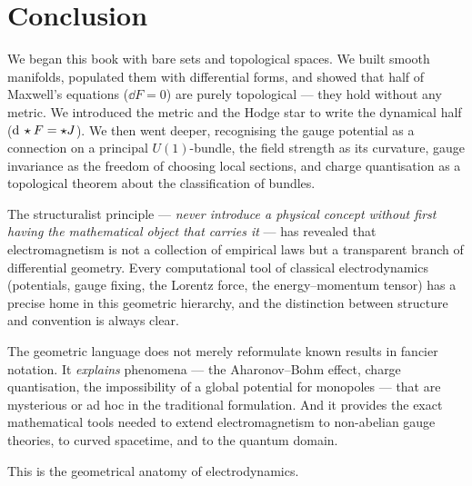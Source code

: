 \section{Conclusion}

We began this book with bare sets and topological spaces. We built smooth manifolds, populated them with differential forms, and showed that half of Maxwell's equations ($\dd F = 0$) are purely topological --- they hold without any metric. We introduced the metric and the Hodge star to write the dynamical half ($\mathrm{d}\,\star F = \star J$). We then went deeper, recognising the gauge potential as a connection on a principal $U(1)$-bundle, the field strength as its curvature, gauge invariance as the freedom of choosing local sections, and charge quantisation as a topological theorem about the classification of bundles.

The structuralist principle --- \emph{never introduce a physical concept without first having the mathematical object that carries it} --- has revealed that electromagnetism is not a collection of empirical laws but a transparent branch of differential geometry. Every computational tool of classical electrodynamics (potentials, gauge fixing, the Lorentz force, the energy--momentum tensor) has a precise home in this geometric hierarchy, and the distinction between structure and convention is always clear.

The geometric language does not merely reformulate known results in fancier notation. It \emph{explains} phenomena --- the Aharonov--Bohm effect, charge quantisation, the impossibility of a global potential for monopoles --- that are mysterious or ad hoc in the traditional formulation. And it provides the exact mathematical tools needed to extend electromagnetism to non-abelian gauge theories, to curved spacetime, and to the quantum domain.

This is the geometrical anatomy of electrodynamics.
